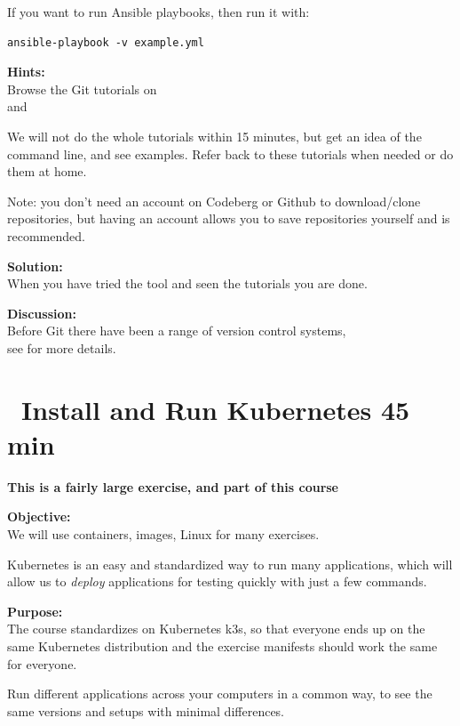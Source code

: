 \documentclass[a4paper,11pt,notitlepage]{report}
\begin{document}
If you want to run Ansible playbooks, then run it with:
\begin{verbatim}
ansible-playbook -v example.yml
\end{verbatim}

{\bf Hints:}\\
Browse the Git tutorials on \\
and 

We will not do the whole tutorials within 15 minutes, but get an idea of the command line, and see examples. Refer back to these tutorials when needed or do them at home.

Note: you don't need an account on Codeberg or Github to download/clone repositories, but having an account allows you to save repositories yourself and is recommended.

{\bf Solution:}\\
When you have tried the tool and seen the tutorials you are done.

{\bf Discussion:}\\
Before Git there have been a range of version control systems,\\
see  for more details.


\chapter{\faExclamationTriangle\ Install and Run Kubernetes 45 min}
\label{ex:sw-kubernetes}


{\Large \bf This is a fairly large exercise, and part of this course}

{\bf Objective:}\\
We will use containers, images, Linux for many exercises.

Kubernetes is an easy and standardized way to run many applications, which will allow us to \emph{deploy} applications for testing quickly with just a few commands.

{\bf Purpose:}\\
The course standardizes on Kubernetes k3s, so that everyone ends up on the same Kubernetes distribution and the exercise manifests should work the same for everyone.

Run different applications across your computers in a common way, to see the same versions and setups with minimal differences.
\end{document}

